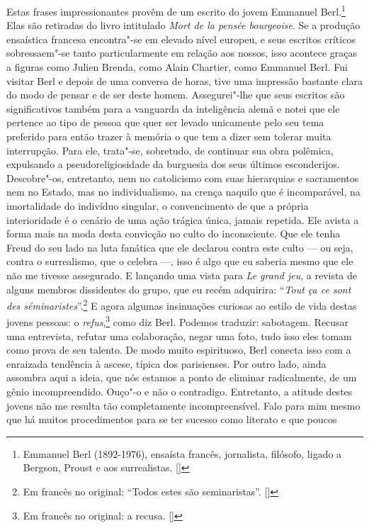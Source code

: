 Estas frases impressionantes provêm de um escrito do jovem Emmanuel
Berl.\footnote{Emmanuel Berl (1892-1976), ensaísta francês,
  jornalista, filósofo, ligado a Bergson, Proust e aos surrealistas. []}
Elas são retiradas do livro intitulado \emph{Mort de la pensée
bourgeoise}. Se a produção ensaística francesa encontra"-se em elevado
nível europeu, e seus escritos críticos sobressaem"-se tanto
particularmente em relação aos nossos, isso acontece graças a figuras
como Julien Brenda, como Alain Chartier, como Emmanuel Berl. Fui visitar
Berl e depois de uma conversa de horas, tive uma impressão bastante
clara do modo de pensar e de ser deste homem. Assegurei"-lhe que seus
escritos são significativos também para a vanguarda da inteligência
alemã e notei que ele pertence ao tipo de pessoa que quer ser levado
unicamente pelo seu tema preferido para então trazer à memória o que tem
a dizer sem tolerar muita interrupção. Para ele, trata"-se, sobretudo, de
continuar sua obra polêmica, expulsando a pseudoreligiosidade da
burguesia dos seus últimos esconderijos. Descobre"-os, entretanto, nem no
catolicismo com suas hierarquias e sacramentos nem no Estado, mas no
individualismo, na crença naquilo que é incomparável, na imortalidade do
indivíduo singular, o convencimento de que a própria interioridade é o
cenário de uma ação trágica única, jamais repetida. Ele avista a forma
mais na moda desta convicção no culto do inconsciente. Que ele tenha
Freud do seu lado na luta fanática que ele declarou contra este culto ---
ou seja, contra o surrealismo, que o celebra ---, isso é algo que eu
saberia mesmo que ele não me tivesse assegurado. E lançando uma vista
para \emph{Le grand jeu}, a revista de alguns membros dissidentes do
grupo, que eu recém adquirira: ``\emph{Tout ça ce sont des
séminaristes}''.\footnote{Em francês no original: ``Todos estes são
  seminaristas''. []} E agora algumas insinuações curiosas ao estilo de
vida destas jovens pessoas: o \emph{refus},\footnote{Em francês no original: a recusa. []} como diz Berl. Podemos traduzir: sabotagem.
Recusar uma entrevista, refutar uma colaboração, negar uma foto, tudo
isso eles tomam como prova de seu talento. De modo muito espirituoso,
Berl conecta isso com a enraizada tendência à ascese, típica dos
parisienses. Por outro lado, ainda assombra aqui a ideia, que nós
estamos a ponto de eliminar radicalmente, de um gênio incompreendido.
Ouço"-o e não o contradigo. Entretanto, a atitude destes jovens não me
resulta tão completamente incompreensível. Falo para mim mesmo que há
muitos procedimentos para se ter sucesso como literato e que poucos

